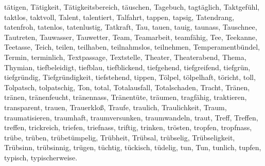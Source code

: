 \documentclass[a4paper,10pt,fleqn,twocolumn,twoside,dvipdfmx]{scrartcl}
\begin{document}
tätigen,
Tätigkeit,
Tätigkeitsbereich,
täuschen,
Tagebuch,
tagtäglich,
Taktgefühl,
taktlos,
taktvoll,
Talent,
talentiert,
Talfahrt,
tappen,
tapsig,
Tatendrang,
tatenfroh,
tatenlos,
tatenlustig,
Tatkraft,
Tau,
tauen,
tauig,
taunass,
Tauschnee,
Tautreten,
Tauwasser,
Tauwetter,
Team,
Teamarbeit,
teamfähig,
Tee,
Teekanne,
Teetasse,
Teich,
teilen,
teilhaben,
teilnahmslos,
teilnehmen,
Temperamentbündel,
Termin,
terminlich,
Textpassage,
Textstelle,
Theater,
Theaterabend,
Thema,
Thymian,
tiefbeleidigt,
tiefblau,
tiefblickend,
tiefgehend,
tiefgreifend,
tiefgrün,
tiefgründig,
Tiefgründigkeit,
tiefstehend,
tippen,
Tölpel,
tölpelhaft,
töricht,
toll,
Tolpatsch,
tolpatschig,
Ton,
total,
Totalausfall,
Totalschaden,
Tracht,
Tränen,
tränen,
tränenfeucht,
tränennass,
Tränentüte,
träumen,
tragfähig,
traktieren,
transparent,
trauen,
Trauerkloß,
Traufe,
traulich,
Traulichkeit,
Traum,
traumatisieren,
traumhaft,
traumversunken,
traumwandeln,
traut,
Treff,
Treffen,
treffen,
trickreich,
triefen,
triefnass,
triftig,
trinken,
trösten,
tropfen,
tropfnass,
trübe,
trüben,
trübetümpelig,
Trübheit,
Trübsal,
trübselig,
Trübseligkeit,
Trübsinn,
trübsinnig,
trügen,
tüchtig,
tückisch,
tüdelig,
tun,
Tun,
tunlich,
tupfen,
typisch,
typischerweise.
\end{document}
